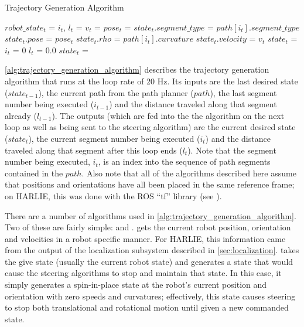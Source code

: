 \begin{algorithm}
\caption{Trajectory Generation Algorithm}
\label{alg:trajectory_generation_algorithm}
\DontPrintSemicolon
{}


$robot\_state_t$ = \GetCurrentRobotState{} \;
{
	$i_t$, $l_t$ =  \;
	$v_t$ =  \;
	$pose_t$ =  \;
	$state_t.segment\_type$ = $path\left[i_t\right].segment\_type$ \;
	$state_t.pose$ = $pose_t$ \;
	$state_t.rho$ = $path\left[i_t\right].curvature$ \;
	$state_t.velocity$ = $v_t$ \;
	\;
	{
		$state_t$ =  \;
	}
}
{
	$i_t$ = $0$ \;
	$l_t$ = $0.0$ \;
	$state_t$ =  \;
}
\end{algorithm}

\autoref{alg:trajectory_generation_algorithm} describes the trajectory generation algorithm that runs at the loop rate of 20 Hz. Its inputs are the last desired state ($state_{t-1}$), the current path from the path planner ($path$), the last segment number being executed ($i_{t-1}$) and the distance traveled along that segment already ($l_{t-1}$). The outputs (which are fed into the the algorithm on the next loop as well as being sent to the steering algorithm) are the current desired state ($state_t$), the current segment number being executed ($i_t$) and the distance traveled along that segment after this loop ends ($l_t$). Note that the segment number being executed, $i_t$, is an index into the sequence of path segments contained in the $path$. Also note that all of the algorithms described here assume that positions and orientations have all been placed in the same reference frame; on HARLIE, this was done with the ROS ``tf'' library (see ).

There are a number of algorithms used in \autoref{alg:trajectory_generation_algorithm}. Two of these are fairly simple: \GetCurrentRobotState and \MakeHaltState. \GetCurrentRobotState gets the current robot position, orientation and velocities in a robot specific manner. For HARLIE, this information came from the output of the localization subsystem described in \autoref{sec:localization}. \MakeHaltState takes the give state (usually the current robot state) and generates a state that would cause the steering algorithms to stop and maintain that state. In this case, it simply generates a spin-in-place state at the robot's current position and orientation with zero speeds and curvatures; effectively, this state causes steering to stop both translational and rotational motion until given a new commanded state.

